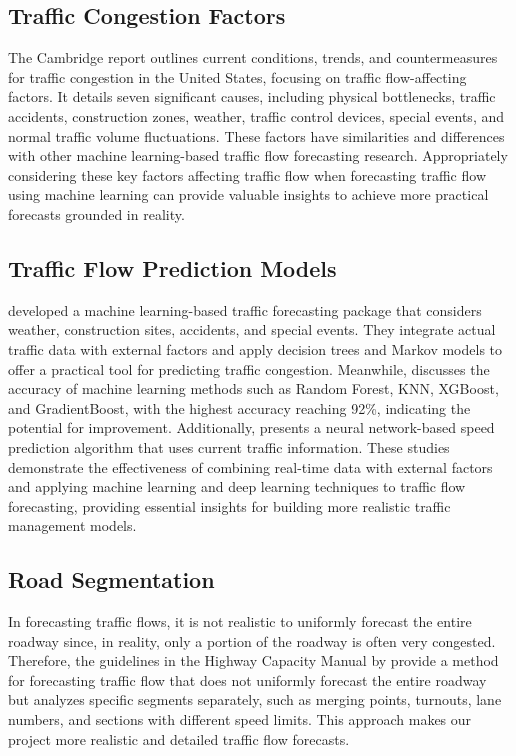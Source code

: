 \documentclass{report}
\begin{document}
\subsection{Traffic Congestion Factors}
 The Cambridge \citet{systematics2005traffic} report outlines current conditions, trends, and countermeasures for traffic congestion in the United States, focusing on traffic flow-affecting factors. It details seven significant causes, including physical bottlenecks, traffic accidents, construction zones, weather, traffic control devices, special events, and normal traffic volume fluctuations. These factors have similarities and differences with other machine learning-based traffic flow forecasting research. Appropriately considering these key factors affecting traffic flow when forecasting traffic flow using machine learning can provide valuable insights to achieve more practical forecasts grounded in reality.

\subsection{Traffic Flow Prediction Models}
 \citet{garrett2020integrated} developed a machine learning-based traffic forecasting package that considers weather, construction sites, accidents, and special events. They integrate actual traffic data with external factors and apply decision trees and Markov models to offer a practical tool for predicting traffic congestion. Meanwhile, \citet{zafar2020traffic} discusses the accuracy of machine learning methods such as Random Forest, KNN, XGBoost, and GradientBoost, with the highest accuracy reaching 92\%, indicating the potential for improvement. Additionally, \citet{park2011real} presents a neural network-based speed prediction algorithm that uses current traffic information. These studies demonstrate the effectiveness of combining real-time data with external factors and applying machine learning and deep learning techniques to traffic flow forecasting, providing essential insights for building more realistic traffic management models.

\subsection{Road Segmentation}
 In forecasting traffic flows, it is not realistic to uniformly forecast the entire roadway since, in reality, only a portion of the roadway is often very congested. Therefore, the guidelines in the Highway Capacity Manual by \citet{bob2023freeway} provide a method for forecasting traffic flow that does not uniformly forecast the entire roadway but analyzes specific segments separately, such as merging points, turnouts, lane numbers, and sections with different speed limits. This approach makes our project more realistic and detailed traffic flow forecasts.
\end{document}
